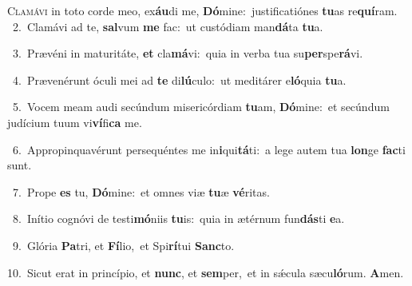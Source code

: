\lettrine{\initial\textcolor{\initialcolor}{C}}{lamávi} in toto corde meo, ex\-\textbf{áu}\-di me, \textbf{Dó}\-mine:~\star justificatiónes \textbf{tu}\-as re\-\textbf{quí}\-ram.\\
{\numbfont\textcolor{\numbcolor}{~2.}}~Clamávi ad te, \textbf{sal}\-vum \textbf{me} fac:~\star ut custódiam man\-\textbf{dá}\-ta \textbf{tu}\-a.\par
{\numbfont\textcolor{\numbcolor}{~3.}}~Prævéni in maturitáte, \textbf{et} cla\-\textbf{má}\-vi:~\star quia in verba tua su\-\textbf{per}\-spe\-\textbf{rá}\-vi.\par
{\numbfont\textcolor{\numbcolor}{~4.}}~Prævenérunt óculi mei ad \textbf{te} di\-\textbf{lú}\-culo:~\star ut meditárer e\-\textbf{ló}\-quia \textbf{tu}\-a.\par
{\numbfont\textcolor{\numbcolor}{~5.}}~Vocem meam audi secúndum misericórdiam \textbf{tu}\-am, \textbf{Dó}\-mine:~\star et secúndum judícium tuum vi\-\textbf{ví}\-fi\textbf{ca} me.\par
{\numbfont\textcolor{\numbcolor}{~6.}}~Appropinquavérunt persequéntes me in\-\textbf{i}\-qui\-\textbf{tá}\-ti:~\star a lege autem tua \textbf{lon}\-ge \textbf{fac}\-ti sunt.\par
{\numbfont\textcolor{\numbcolor}{~7.}}~Prope \textbf{es} tu, \textbf{Dó}\-mine:~\star et omnes viæ \textbf{tu}\-æ \textbf{vé}\-ritas.\par
{\numbfont\textcolor{\numbcolor}{~8.}}~Inítio cognóvi de testi\-\textbf{mó}\-niis \textbf{tu}\-is:~\star quia in ætérnum fun\-\textbf{dás}\-ti \textbf{e}\-a.\par
{\numbfont\textcolor{\numbcolor}{~9.}}~Glória \textbf{Pa}\-tri, et \textbf{Fí}\-lio,~\star et Spi\-\textbf{rí}\-tui \textbf{Sanc}\-to.\par
{\numbfont\textcolor{\numbcolor}{10.}}~Sicut erat in princípio, et \textbf{nunc}\-, et \textbf{sem}\-per,~\star et in sǽcula sæcu\-\textbf{ló}\-rum. \textbf{A}\-men.\par
